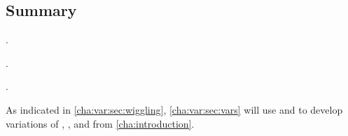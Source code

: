







\subsection{Summary}
\label{cha:var:ros:summary}

\begin{note}
  \supportI{}.

  .

  \supportII{}.
\end{note}

\begin{note}
  As indicated in \autoref{cha:var:sec:wiggling}, \autoref{cha:var:sec:vars} will use  and  to develop variations of \qWhy{}, \qHow{}, and \issueInclusion{} from \autoref{cha:introduction}.
\end{note}


